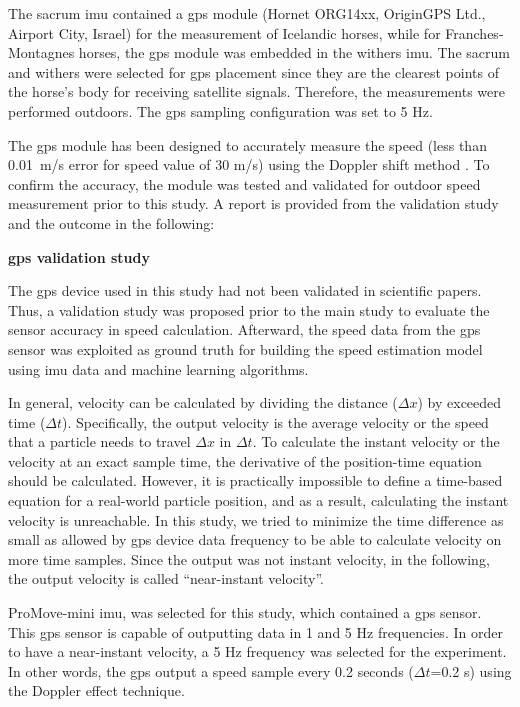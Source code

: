 The sacrum \gls{imu} contained a \gls{gps} module (Hornet ORG14xx, OriginGPS Ltd., Airport City, Israel) for the measurement of Icelandic horses, while for Franches-Montagnes horses, the \gls{gps} module was embedded in the withers \gls{imu}. The sacrum and withers were selected for \gls{gps} placement since they are the clearest points of the horse's body for receiving satellite signals. Therefore, the measurements were performed outdoors. The \gls{gps} sampling configuration was set to 5 Hz. 

The \gls{gps} module has been designed to accurately measure the speed (less than 0.01~m/s error for speed value of 30 m/s) using the Doppler shift method \cite{hornet}. To confirm the accuracy, the module was tested and validated for outdoor speed measurement prior to this study. A report is provided from the validation study and the outcome in the following:

\vspace{3mm}
\noindent\textbf{\gls{gps} validation study}

The \gls{gps} device used in this study had not been validated in scientific papers. Thus, a validation study was proposed prior to the main study to evaluate the sensor accuracy in speed calculation. Afterward, the speed data from the \gls{gps} sensor was exploited as ground truth for building the speed estimation model using \gls{imu} data and machine learning algorithms.

In general, velocity can be calculated by dividing the distance ($\Delta x$) by exceeded time ($\Delta t$). Specifically, the output velocity is the average velocity or the speed that a particle needs to travel $\Delta x$ in $\Delta t$. To calculate the instant velocity or the velocity at an exact sample time, the derivative of the position-time equation should be calculated. However, it is practically impossible to define a time-based equation for a real-world particle position, and as a result, calculating the instant velocity is unreachable. In this study, we tried to minimize the time difference as small as allowed by \gls{gps} device data frequency to be able to calculate velocity on more time samples. Since the output was not instant velocity, in the following, the output velocity is called “near-instant velocity”.

ProMove-mini \gls{imu}, was selected for this study, which contained a \gls{gps} sensor. This \gls{gps} sensor is capable of outputting data in 1 and 5 Hz frequencies. In order to have a near-instant velocity, a 5 Hz frequency was selected for the experiment. In other words, the \gls{gps} output a speed sample every 0.2 seconds ($\Delta t$=0.2 s) using the Doppler effect technique. 

